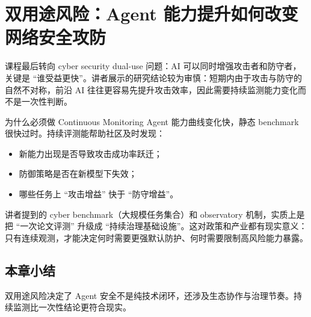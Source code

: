 \section{双用途风险：Agent 能力提升如何改变网络安全攻防}

课程最后转向 cyber security dual-use 问题：AI 可以同时增强攻击者和防守者，关键是 ``谁受益更快''。讲者展示的研究结论较为审慎：短期内由于攻击与防守的自然不对称，前沿 AI 往往更容易先提升攻击效率，因此需要持续监测能力变化而不是一次性判断。

\begin{importantbox}{为什么必须做 Continuous Monitoring}
Agent 能力曲线变化快，静态 benchmark 很快过时。持续评测能帮助社区及时发现：
\begin{itemize}
    \item 新能力出现是否导致攻击成功率跃迁；
    \item 防御策略是否在新模型下失效；
    \item 哪些任务上 ``攻击增益'' 快于 ``防守增益''。
\end{itemize}
\end{importantbox}

讲者提到的 cyber benchmark（大规模任务集合）和 observatory 机制，实质上是把 ``一次论文评测'' 升级成 ``持续治理基础设施''。这对政策和产业都有现实意义：只有连续观测，才能决定何时需要更强默认防护、何时需要限制高风险能力暴露。

\subsection{本章小结}
双用途风险决定了 Agent 安全不是纯技术闭环，还涉及生态协作与治理节奏。持续监测比一次性结论更符合现实。

